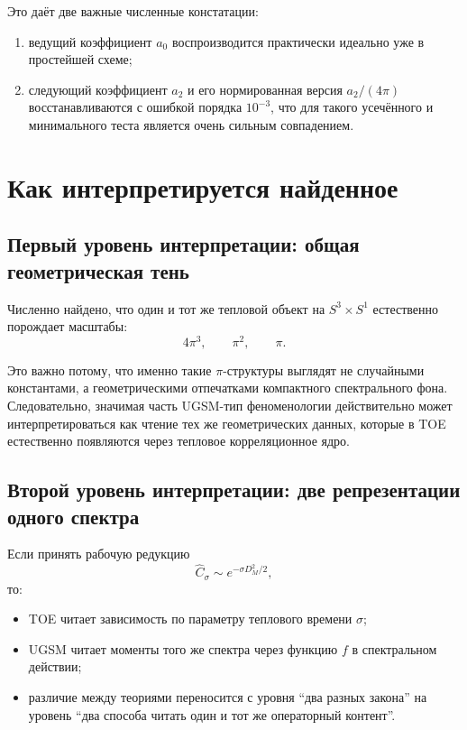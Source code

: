 \documentclass[12pt,a4paper]{article}
\begin{document}
Это даёт две важные численные констатации:
\begin{enumerate}
    \item ведущий коэффициент \(a_0\) воспроизводится практически идеально уже в простейшей схеме;
    \item следующий коэффициент \(a_2\) и его нормированная версия \(a_2/(4\pi)\) восстанавливаются с ошибкой порядка \(10^{-3}\), что для такого усечённого и минимального теста является очень сильным совпадением.
\end{enumerate}

\section{Как интерпретируется найденное}

\subsection{Первый уровень интерпретации: общая геометрическая тень}

Численно найдено, что один и тот же тепловой объект на \(S^3\times S^1\) естественно порождает масштабы:
\[
4\pi^3, \qquad \pi^2, \qquad \pi.
\]

Это важно потому, что именно такие \(\pi\)-структуры выглядят не случайными константами, а геометрическими отпечатками компактного спектрального фона. Следовательно, значимая часть UGSM-тип феноменологии действительно может интерпретироваться как чтение тех же геометрических данных, которые в TOE естественно появляются через тепловое корреляционное ядро.

\subsection{Второй уровень интерпретации: две репрезентации одного спектра}

Если принять рабочую редукцию
\[
\hat C_\sigma \sim e^{-\sigma D_M^2/2},
\]
то:
\begin{itemize}
    \item TOE читает зависимость по параметру теплового времени \(\sigma\);
    \item UGSM читает моменты того же спектра через функцию \(f\) в спектральном действии;
    \item различие между теориями переносится с уровня ``два разных закона'' на уровень ``два способа читать один и тот же операторный контент''.
\end{itemize}
\end{document}
